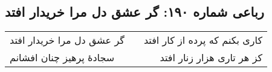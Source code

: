\begin{center}
\section*{رباعی شماره ۱۹۰: گر عشق دل مرا خریدار افتد}
\label{sec:sh190}
\begin{longtable}{l p{0.5cm} r}
گر عشق دل مرا خریدار افتد
&&
کاری بکنم که پرده از کار افتد
\\
سجادهٔ پرهیز چنان افشانم
&&
کز هر تاری هزار زنار افتد
\\
\end{longtable}
\end{center}
